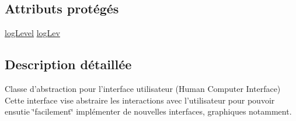 \subsection*{Attributs protégés}
\begin{DoxyCompactItemize}
\item 
\hyperlink{classHCI_a395f0ab7958108f23c34c7a04b56c4b0}{log\-Level} \hyperlink{classHCI_ac344060f03fa9aa1809cfecb507a83f9}{log\-Lev}
\end{DoxyCompactItemize}


\subsection{Description détaillée}
Classe d'abstraction pour l'interface utilisateur (Human Computer Interface) Cette interface vise abstraire les interactions avec l'utilisateur pour pouvoir ensutie \char`\"{}facilement\char`\"{} implémenter de nouvelles interfaces, graphiques notamment. 


